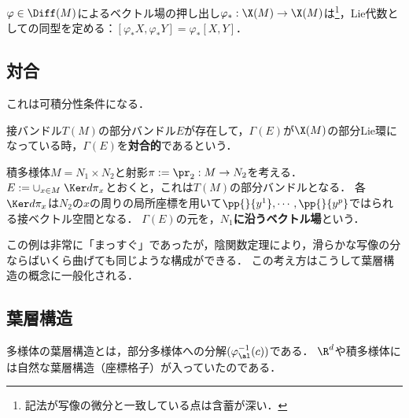\documentclass[uplatex,dvipdfmx]{jsreport}
\begin{document}
\begin{proposition}
    $\varphi\in\Diff(M)$によるベクトル場の押し出し$\varphi_*:\X(M)\to\X(M)$は\footnote{記法が写像の微分と一致している点は含蓄が深い．}，Lie代数としての同型を定める：$[\varphi_*X,\varphi_*Y]=\varphi_*[X,Y]$．
\end{proposition}

\subsection{対合}

\begin{tcolorbox}[colframe=ForestGreen, colback=ForestGreen!10!white,breakable,colbacktitle=ForestGreen!40!white,coltitle=black,fonttitle=\bfseries\sffamily,
title=]
    これは可積分性条件になる．
\end{tcolorbox}

\begin{definition}[involution]
    接バンドル$T(M)$の部分バンドル$E$が存在して，$\Gamma(E)$が$\X(M)$の部分Lie環になっている時，$\Gamma(E)$を\textbf{対合的}であるという．
\end{definition}

\begin{example}
    積多様体$M=N_1\times N_2$と射影$\pi:=\pr_2:M\to N_2$を考える．
    $E:=\cup_{x\in M}\;\Ker d\pi_x$とおくと，これは$T(M)$の部分バンドルとなる．
    各$\Ker d\pi_x$は$N_2$の$x$の周りの局所座標を用いて$\pp{}{y^1},\cdots,\pp{}{y^p}$ではられる接ベクトル空間となる．
    $\Gamma(E)$の元を，\textbf{$N_1$に沿うベクトル場}という．

    この例は非常に「まっすぐ」であったが，陰関数定理により，滑らかな写像の分ならばいくら曲げても同じような構成ができる．
    この考え方はこうして葉層構造の概念に一般化される．
\end{example}

\subsection{葉層構造}

\begin{tcolorbox}[colframe=ForestGreen, colback=ForestGreen!10!white,breakable,colbacktitle=ForestGreen!40!white,coltitle=black,fonttitle=\bfseries\sffamily,
title=]
    多様体の葉層構造とは，部分多様体への分解$(\varphi_\al^{-1}(c))$である．
    $\R^d$や積多様体には自然な葉層構造（座標格子）が入っていたのである．
\end{tcolorbox}
\end{document}
